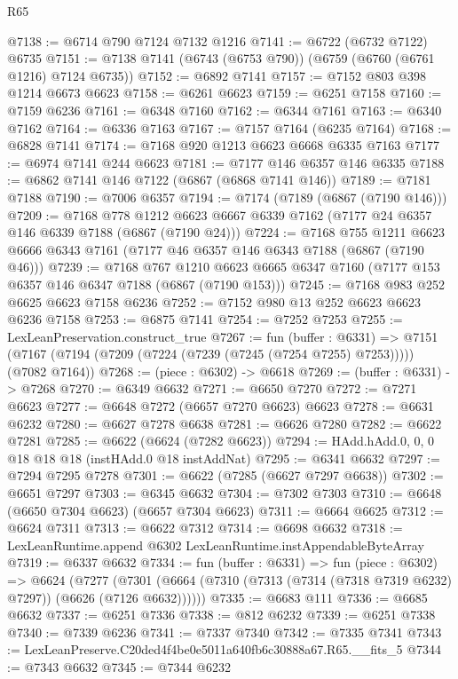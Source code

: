 \begin{lexlean}{R65}
\begin{coremodule}
{@7138 := @6714 @790 @7124 @7132 @1216
@7141 := @6722 (@6732 @7122) @6735
@7151 := @7138 @7141 (@6743 (@6753 @790)) (@6759 (@6760 (@6761 @1216) @7124 @6735))
@7152 := @6892 @7141
@7157 := @7152 @803 @398 @1214 @6673 @6623
@7158 := @6261 @6623
@7159 := @6251 @7158
@7160 := @7159 @6236
@7161 := @6348 @7160
@7162 := @6344 @7161
@7163 := @6340 @7162
@7164 := @6336 @7163
@7167 := @7157 @7164 (@6235 @7164)
@7168 := @6828 @7141
@7174 := @7168 @920 @1213 @6623 @6668 @6335 @7163
@7177 := @6974 @7141 @244 @6623
@7181 := @7177 @146 @6357 @146 @6335
@7188 := @6862 @7141 @146 @7122 (@6867 (@6868 @7141 @146))
@7189 := @7181 @7188
@7190 := @7006 @6357
@7194 := @7174 (@7189 (@6867 (@7190 @146)))
@7209 := @7168
    @778
    @1212
    @6623
    @6667
    @6339
    @7162
    (@7177 @24 @6357 @146 @6339 @7188 (@6867 (@7190 @24)))
@7224 := @7168
    @755
    @1211
    @6623
    @6666
    @6343
    @7161
    (@7177 @46 @6357 @146 @6343 @7188 (@6867 (@7190 @46)))
@7239 := @7168
    @767
    @1210
    @6623
    @6665
    @6347
    @7160
    (@7177 @153 @6357 @146 @6347 @7188 (@6867 (@7190 @153)))
@7245 := @7168 @983 @252 @6625 @6623 @7158 @6236
@7252 := @7152 @980 @13 @252 @6623 @6623 @6236 @7158
@7253 := @6875 @7141
@7254 := @7252 @7253
@7255 := LexLeanPreservation.construct_true
@7267 := fun (buffer : @6331) =>
  @7151 (@7167 (@7194 (@7209 (@7224 (@7239 (@7245 (@7254 @7255) @7253))))) (@7082 @7164))
@7268 := (piece : @6302) -> @6618
@7269 := (buffer : @6331) -> @7268
@7270 := @6349 @6632
@7271 := @6650 @7270
@7272 := @7271 @6623
@7277 := @6648 @7272 (@6657 @7270 @6623) @6623
@7278 := @6631 @6232
@7280 := @6627 @7278 @6638
@7281 := @6626 @7280
@7282 := @6622 @7281
@7285 := @6622 (@6624 (@7282 @6623))
@7294 := HAdd.hAdd.{0, 0, 0} @18 @18 @18 (instHAdd.{0} @18 instAddNat)
@7295 := @6341 @6632
@7297 := @7294 @7295 @7278
@7301 := @6622 (@7285 (@6627 @7297 @6638))
@7302 := @6651 @7297
@7303 := @6345 @6632
@7304 := @7302 @7303
@7310 := @6648 (@6650 @7304 @6623) (@6657 @7304 @6623)
@7311 := @6664 @6625
@7312 := @6624 @7311
@7313 := @6622 @7312
@7314 := @6698 @6632
@7318 := LexLeanRuntime.append @6302 LexLeanRuntime.instAppendableByteArray
@7319 := @6337 @6632
@7334 := fun (buffer : @6331) =>
  fun (piece : @6302) =>
  @6624
    (@7277 (@7301 (@6664 (@7310 (@7313 (@7314 (@7318 @7319 @6232) @7297)) (@6626 (@7126 @6632))))))
@7335 := @6683 @111
@7336 := @6685 @6632
@7337 := @6251 @7336
@7338 := @812 @6232
@7339 := @6251 @7338
@7340 := @7339 @6236
@7341 := @7337 @7340
@7342 := @7335 @7341
@7343 := LexLeanPreserve.C20ded4f4be0e5011a640fb6c30888a67.R65.__fits_5
@7344 := @7343 @6632
@7345 := @7344 @6232
}
\end{coremodule}
\end{lexlean}
